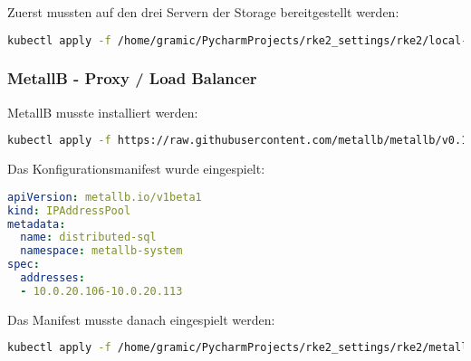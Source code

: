 Zuerst mussten auf den drei Servern der Storage bereitgestellt werden:
\lstset{style=gra_codestyle}
\begin{lstlisting}[language=bash, caption=local-path-storage aktualisieren,captionpos=b,label={lst:local-path-storage-apply},breaklines=true]
kubectl apply -f /home/gramic/PycharmProjects/rke2_settings/rke2/local-path-provisioner.yaml
\end{lstlisting}

\subsubsection{MetallB - Proxy / Load Balancer}
MetallB musste installiert werden:
\lstset{style=gra_codestyle}
\begin{lstlisting}[language=bash, caption=MetallB installieren,captionpos=b,label={lst:metallb-install},breaklines=true]
kubectl apply -f https://raw.githubusercontent.com/metallb/metallb/v0.14.4/config/manifests/metallb-native.yaml
\end{lstlisting}

Das Konfigurationsmanifest wurde eingespielt:
\lstset{style=gra_codestyle}
\begin{lstlisting}[language=yaml, caption=MetallB konfigurieren,captionpos=b,label={lst:metallb-config},breaklines=true]
apiVersion: metallb.io/v1beta1
kind: IPAddressPool
metadata:
  name: distributed-sql
  namespace: metallb-system
spec:
  addresses:
  - 10.0.20.106-10.0.20.113
\end{lstlisting}

Das Manifest musste danach eingespielt werden:
\lstset{style=gra_codestyle}
\begin{lstlisting}[language=bash, caption=MetallB Konfiguration einspielen,captionpos=b,label={lst:metallb-apply},breaklines=true]
kubectl apply -f /home/gramic/PycharmProjects/rke2_settings/rke2/metallb-values.yaml
\end{lstlisting}

